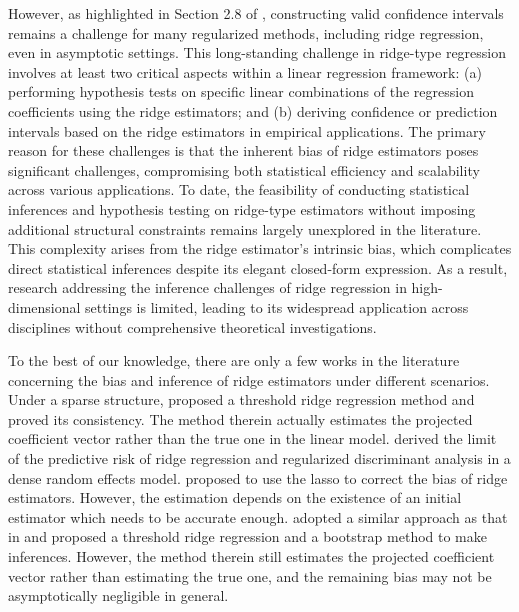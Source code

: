 However, as highlighted in Section 2.8 of \cite{athey2019machine}, constructing valid confidence intervals remains a challenge for many regularized methods, including ridge regression, even in asymptotic settings. This long-standing challenge in ridge-type regression involves at least two critical aspects within a linear regression framework:
(a) performing hypothesis tests on specific linear combinations of the regression coefficients using the  ridge estimators; and
(b) deriving confidence or prediction intervals based on the ridge estimators in empirical applications.
The primary reason for these challenges is that the inherent bias of ridge estimators poses significant challenges, compromising both statistical efficiency and scalability across various applications. To date, the feasibility of conducting statistical inferences and hypothesis testing on ridge-type estimators without imposing additional structural constraints remains largely unexplored in the literature. This complexity arises from the ridge estimator's intrinsic bias, which complicates direct statistical inferences despite its elegant closed-form expression.
As a result, research addressing the inference challenges of ridge regression in high-dimensional settings is limited, leading to its widespread application across disciplines without comprehensive theoretical investigations.






To the best of our knowledge, there are only a few works in the literature concerning the bias and inference of ridge estimators under different scenarios. Under a sparse structure, \cite{shao2012estimation} proposed a threshold ridge regression method and proved its consistency. The method therein actually estimates the projected coefficient vector rather than the true one in the linear model. \cite{dobriban2018high} derived the limit of the predictive risk of ridge regression and regularized discriminant analysis in a dense random effects model. \cite{buhlmann2013statistical} proposed to use the lasso to correct the bias of ridge estimators. However, the estimation depends on the existence of an initial estimator which needs to be accurate enough. \cite{zhang2022ridge} adopted a similar approach as that in \cite{shao2012estimation} and proposed a threshold ridge regression and a bootstrap method to make inferences. However, the method therein still estimates the projected coefficient vector rather than estimating the true one, and the remaining bias may not be asymptotically negligible in general.









